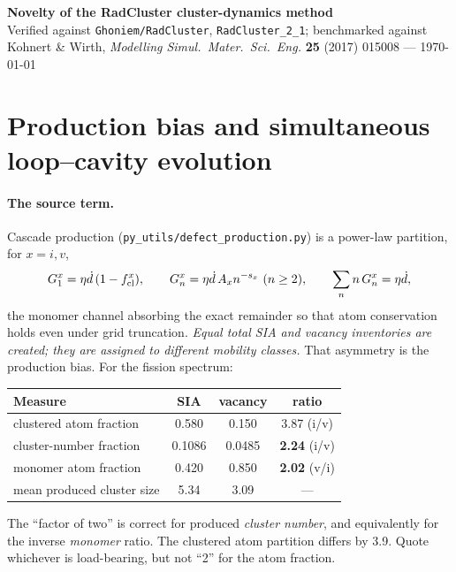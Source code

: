 \documentclass[11pt,a4paper]{article}
\newcommand{\code}[1]{\texttt{\small #1}}
\begin{document}
\begin{center}
{\large\bfseries Novelty of the RadCluster cluster-dynamics method}\\[2pt]
{\footnotesize Verified against \code{Ghoniem/RadCluster}, \code{RadCluster\_2\_1};
benchmarked against Kohnert \& Wirth, \emph{Modelling Simul.\ Mater.\ Sci.\ Eng.} \textbf{25} (2017) 015008 --- \today}
\end{center}
\vspace{2pt}

\section{Production bias and simultaneous loop--cavity evolution}

\paragraph{The source term.}
Cascade production (\code{py\_utils/defect\_production.py}) is a power-law
partition, for $x=i,v$,
\[
G^x_1=\eta\dot d\,(1-f^x_{\rm cl}),\qquad
G^x_n=\eta\dot d\,A_x n^{-s_x}\ (n\ge2),\qquad
\sum_n n\,G^x_n=\eta\dot d ,
\]
the monomer channel absorbing the exact remainder so that atom conservation holds
even under grid truncation. \emph{Equal total SIA and vacancy inventories are
created; they are assigned to different mobility classes.} That asymmetry is the
production bias. For the fission spectrum:

\begin{center}\footnotesize\setlength{\tabcolsep}{6pt}
\begin{tabular}{lccc}
\toprule
Measure & SIA & vacancy & ratio \\
\midrule
clustered atom fraction & 0.580 & 0.150 & 3.87 (i/v) \\
cluster-number fraction & 0.1086 & 0.0485 & \textbf{2.24} (i/v) \\
monomer atom fraction & 0.420 & 0.850 & \textbf{2.02} (v/i) \\
mean produced cluster size & 5.34 & 3.09 & --- \\
\bottomrule
\end{tabular}
\end{center}

\noindent The ``factor of two'' is correct for produced \emph{cluster number}, and
equivalently for the inverse \emph{monomer} ratio. The clustered atom partition
differs by 3.9. Quote whichever is load-bearing, but not ``2'' for the atom
fraction.
\end{document}
